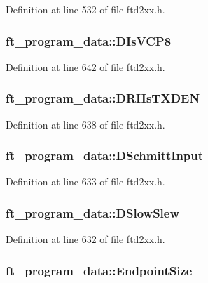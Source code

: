 Definition at line 532 of file ftd2xx.h.\hypertarget{structft__program__data_a48ca69a0ef38cbae0b5de3adff574bb7}{
\subsubsection[{DIsVCP8}]{ {\bf ft\_\-program\_\-data::DIsVCP8}}}
\label{structft__program__data_a48ca69a0ef38cbae0b5de3adff574bb7}


Definition at line 642 of file ftd2xx.h.\hypertarget{structft__program__data_a343aa9d26bc40a39661095196fa850b1}{
\subsubsection[{DRIIsTXDEN}]{ {\bf ft\_\-program\_\-data::DRIIsTXDEN}}}
\label{structft__program__data_a343aa9d26bc40a39661095196fa850b1}


Definition at line 638 of file ftd2xx.h.\hypertarget{structft__program__data_a380023a0d791951f3365a804b72d4b63}{
\subsubsection[{DSchmittInput}]{ {\bf ft\_\-program\_\-data::DSchmittInput}}}
\label{structft__program__data_a380023a0d791951f3365a804b72d4b63}


Definition at line 633 of file ftd2xx.h.\hypertarget{structft__program__data_adfbbf08781239df8c124f00785c8b7cb}{
\subsubsection[{DSlowSlew}]{ {\bf ft\_\-program\_\-data::DSlowSlew}}}
\label{structft__program__data_adfbbf08781239df8c124f00785c8b7cb}


Definition at line 632 of file ftd2xx.h.\hypertarget{structft__program__data_adef6d265cbf1ca51540468b6f39c387a}{
\subsubsection[{EndpointSize}]{ {\bf ft\_\-program\_\-data::EndpointSize}}}
\label{structft__program__data_adef6d265cbf1ca51540468b6f39c387a}


